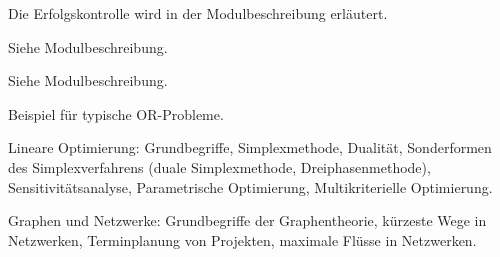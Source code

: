 \begin{course}

\setdoclanguagegerman
{}



\coursehead


\label{cour_4401.dp_997}


\begin{styleenv}
\begin{assessment}
Die Erfolgskontrolle wird in der Modulbeschreibung erläutert.


\end{assessment}

\begin{conditions}Siehe Modulbeschreibung.

\end{conditions}


\end{styleenv}

\begin{learningoutcomes}
Siehe Modulbeschreibung.


\end{learningoutcomes}

\begin{content}
Beispiel für typische OR-Probleme.

 

Lineare Optimierung: Grundbegriffe, Simplexmethode, Dualität, Sonderformen des Simplexverfahrens (duale Simplexmethode, Dreiphasenmethode), Sensitivitätsanalyse, Parametrische Optimierung, Multikriterielle Optimierung.

 

Graphen und Netzwerke: Grundbegriffe der Graphentheorie, kürzeste Wege in Netzwerken, Terminplanung von Projekten, maximale Flüsse in Netzwerken.



\end{content}
\end{course}
